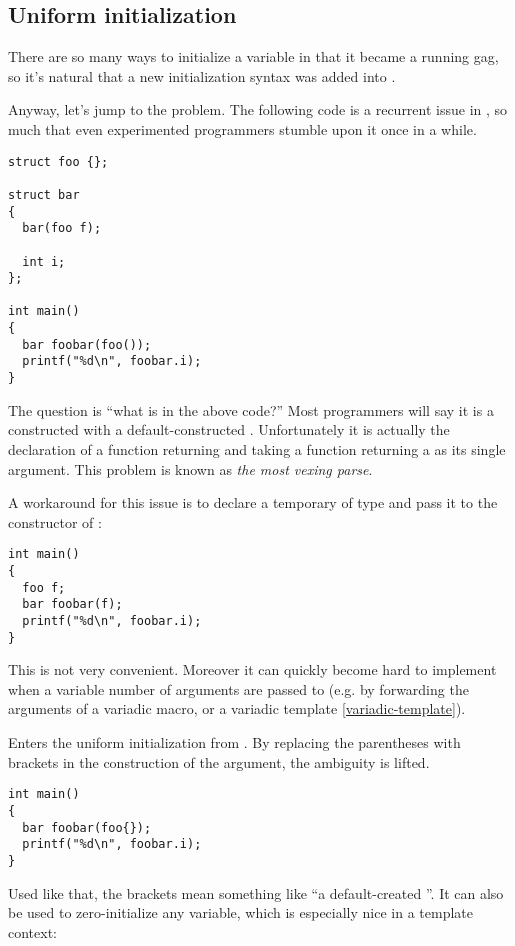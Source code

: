 \subsection{Uniform initialization}

There are so many ways to initialize a variable in \cpp{} that it
became a running gag, so it's natural that a new initialization syntax
was added into .

Anyway, let's jump to the problem. The following code is a recurrent
issue in \cpp{}, so much that even experimented programmers stumble
upon it once in a while.

\begin{lstlisting}
struct foo {};

struct bar
{
  bar(foo f);

  int i;
};

int main()
{
  bar foobar(foo());
  printf("%d\n", foobar.i);
}
\end{lstlisting}

The question is ``what is  in the above code?'' Most
\cpp{} programmers will say it is a  constructed with a
default-constructed . Unfortunately it is actually the
declaration of a function returning  and taking a function
returning a  as its single argument. This problem is known
as \emph{the most vexing parse}.

A workaround for this issue is to declare a temporary of type
 and pass it to the constructor of :

\begin{lstlisting}
int main()
{
  foo f;
  bar foobar(f);
  printf("%d\n", foobar.i);
}
\end{lstlisting}

This is not very convenient. Moreover it can quickly become hard to
implement when a variable number of arguments are passed to
 (e.g. by forwarding the arguments of a variadic macro,
or a variadic template \ref{variadic-template}).

\bigskip

Enters the uniform initialization from . By replacing the
parentheses with brackets in the construction of the argument, the
ambiguity is lifted.

\begin{lstlisting}
int main()
{
  bar foobar(foo{});
  printf("%d\n", foobar.i);
}
\end{lstlisting}

Used like that, the brackets mean something like ``a default-created
''. It can also be used to zero-initialize any variable,
which is especially nice in a template context:

